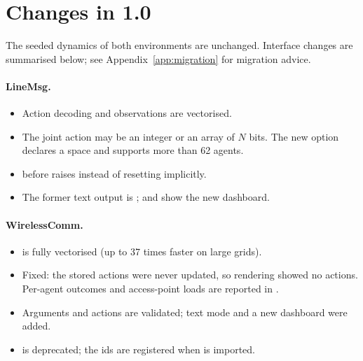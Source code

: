 \section{Changes in 1.0}\label{sec:networked-changes}

The seeded dynamics of both environments are unchanged. Interface changes are
summarised below; see Appendix~\ref{app:migration} for migration advice.

\paragraph{LineMsg.}
\begin{itemize}
  \item Action decoding and observations are vectorised.
  \item The joint action may be an integer or an array of $N$ bits. The new
        option  declares a
         space and supports more than 62 agents.
  \item {} before  raises instead of resetting
        implicitly.
  \item The former text output is ; 
        and  show the new dashboard.
\end{itemize}

\paragraph{WirelessComm.}
\begin{itemize}
  \item {} is fully vectorised (up to 37 times faster on large grids).
  \item Fixed: the stored actions were never updated, so rendering showed no
        actions. Per-agent outcomes and access-point loads are reported in
        .
  \item Arguments and actions are validated;  text mode and a new
        dashboard were added.
  \item {} is deprecated; the ids
        are registered when  is imported.
\end{itemize}

\endgroup
